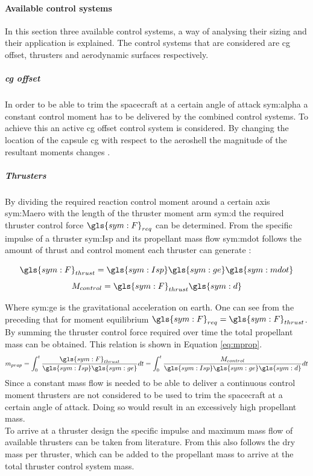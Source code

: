 \paragraph{Available control systems}
\label{control:system}
In this section three available control systems, a way of analysing their sizing and their application is explained. The control systems that are considered are \gls{cg} offset, thrusters and aerodynamic surfaces respectively.

\subparagraph{\acrlong{cg} offset}
In order to be able to trim the spacecraft at a certain angle of attack \gls{sym:alpha} a constant control moment has to be delivered by the combined control systems. To achieve this an active \gls{cg} offset control system is considered. By changing the location of the capsule \gls{cg} with respect to the aeroshell the magnitude of the resultant moments changes \cite{Mulqueen1991}. 



\subparagraph{Thrusters}
\label{subpar:thrusters}
By dividing the required reaction control moment around a certain axis \gls{sym:Maero} with the length of the thruster moment arm \gls{sym:d} the required thruster control force $\gls{sym:F}_{req}$ can be determined. From the specific impulse of a thruster \gls{sym:Isp} and its propellant mass flow \gls{sym:mdot} follows the amount of thrust and control moment each thruster can generate \cite{Allen2012}:
\begin{multicols}{2}
\begin{equation}
\gls{sym:F}_{thrust}=\gls{sym:Isp}\gls{sym:ge}\gls{sym:mdot}
\label{eq:Fthrust}
\end{equation}
\begin{equation}
M_{control}=\gls{sym:F}_{thrust}\gls{sym:d}
\end{equation}
\end{multicols}
Where \gls{sym:ge} is the gravitational acceleration on earth. One can see from the preceding that for moment equilibrium $\gls{sym:F}_{req}=\gls{sym:F}_{thrust}$. By summing the thruster control force required over time the total propellant mass can be obtained. This relation is shown in Equation \ref{eq:mprop}.
\begin{equation}
m_{prop}=\int_{0}^{t} \frac{\gls{sym:F}_{thrust}}{\gls{sym:Isp}\gls{sym:ge}} dt = \int_{0}^{t} \frac{M_{control}}{\gls{sym:Isp}\gls{sym:ge}\gls{sym:d}} dt
\label{eq:mprop}
\end{equation}
Since a constant mass flow is needed to be able to deliver a continuous control moment thrusters are not considered to be used to trim the spacecraft at a certain angle of attack. Doing so would result in an excessively high propellant mass. \\
To arrive at a thruster design the specific impulse and maximum mass flow of available thrusters can be taken from literature. From this also follows the dry mass per thruster, which can be added to the propellant mass to arrive at the total thruster control system mass.

